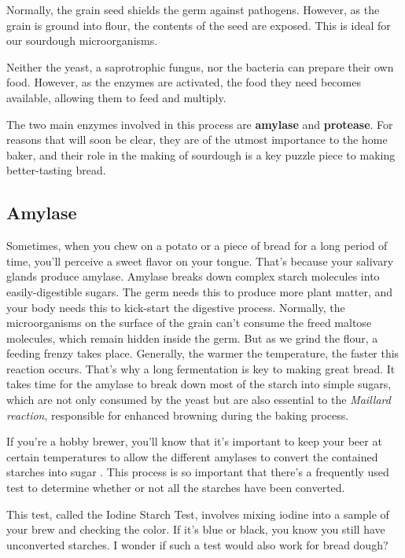 Normally, the grain seed shields the germ against pathogens. However, as the
grain is ground into flour, the contents of the seed are exposed. This is ideal
for our sourdough microorganisms.

Neither the yeast, a saprotrophic fungus, nor the bacteria can
prepare their own food. However, as the enzymes are activated, the food they
need becomes available, allowing them to feed and multiply.

The two main enzymes involved in this process are \textbf{amylase} and
\textbf{protease}. For reasons that will soon be clear, they are of the utmost
importance to the home baker, and their role in the making of sourdough is a
key puzzle piece to making better-tasting bread.

\subsection{Amylase}

Sometimes, when you chew on a potato or a piece of bread for a long period
of time, you'll perceive a sweet flavor on your tongue. That's because your
salivary glands produce amylase. Amylase breaks down complex starch molecules
into easily-digestible sugars. The germ needs this to produce more plant
matter, and your body needs this to kick-start the digestive process. Normally,
the microorganisms on the surface of the grain can't consume the freed maltose
molecules, which remain hidden inside the germ. But as we grind the flour, a
feeding frenzy takes place. Generally, the warmer the temperature, the faster
this reaction occurs. That's why a long fermentation is key to making great
bread. It takes time for the amylase to break down most of the starch into
simple sugars, which are not only consumed by the yeast but are also essential
to the \textit{Maillard reaction}, responsible for enhanced browning during the
baking process.

If you're a hobby brewer, you'll know that it's important to keep your beer at
certain temperatures to allow the different amylases to convert the contained
starches into sugar \cite{beer+amylase}. This process is so important that
there's a frequently used test to determine whether or not all the starches
have been converted.

This test, called the Iodine Starch Test, involves mixing iodine into a sample
of your brew and checking the color. If it's blue or black, you know you still
have unconverted starches. I wonder if such a test would also work for bread
dough?

